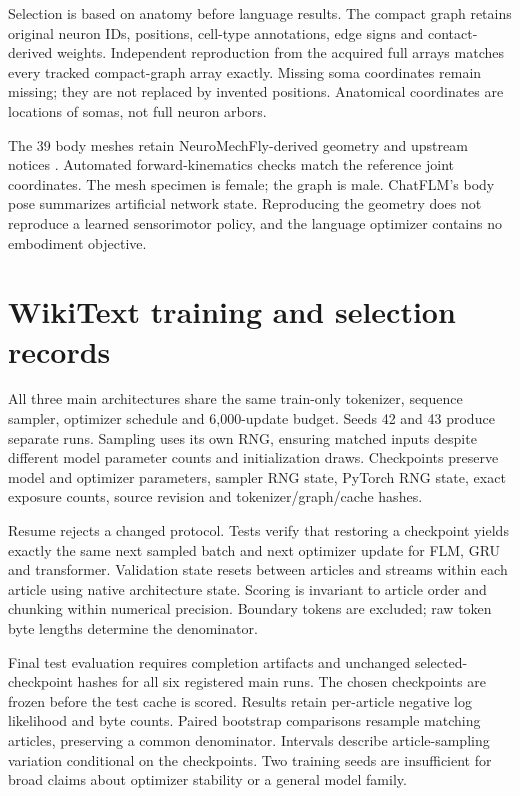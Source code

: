 \documentclass[10pt]{article}
\begin{document}
Selection is based on anatomy before language results. The compact graph retains original neuron IDs, positions, cell-type annotations, edge signs and contact-derived weights. Independent reproduction from the acquired full arrays matches every tracked compact-graph array exactly. Missing soma coordinates remain missing; they are not replaced by invented positions. Anatomical coordinates are locations of somas, not full neuron arbors.

The 39 body meshes retain NeuroMechFly-derived geometry and upstream notices \cite{neuromechfly}. Automated forward-kinematics checks match the reference joint coordinates. The mesh specimen is female; the graph is male. ChatFLM's body pose summarizes artificial network state. Reproducing the geometry does not reproduce a learned sensorimotor policy, and the language optimizer contains no embodiment objective.

\section{WikiText training and selection records}
All three main architectures share the same train-only tokenizer, sequence sampler, optimizer schedule and 6,000-update budget. Seeds 42 and 43 produce separate runs. Sampling uses its own RNG, ensuring matched inputs despite different model parameter counts and initialization draws. Checkpoints preserve model and optimizer parameters, sampler RNG state, PyTorch RNG state, exact exposure counts, source revision and tokenizer/graph/cache hashes.

Resume rejects a changed protocol. Tests verify that restoring a checkpoint yields exactly the same next sampled batch and next optimizer update for FLM, GRU and transformer. Validation state resets between articles and streams within each article using native architecture state. Scoring is invariant to article order and chunking within numerical precision. Boundary tokens are excluded; raw token byte lengths determine the denominator.

Final test evaluation requires completion artifacts and unchanged selected-checkpoint hashes for all six registered main runs. The chosen checkpoints are frozen before the test cache is scored. Results retain per-article negative log likelihood and byte counts. Paired bootstrap comparisons resample matching articles, preserving a common denominator. Intervals describe article-sampling variation conditional on the checkpoints. Two training seeds are insufficient for broad claims about optimizer stability or a general model family.
\end{document}
